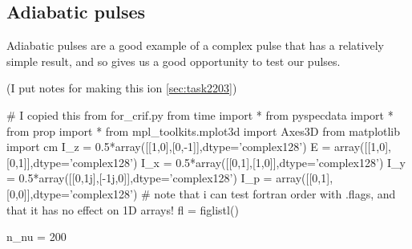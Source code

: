\subsection{Adiabatic pulses}
Adiabatic pulses are a good example of a complex pulse that has a relatively simple result, and so gives us a good opportunity to test our pulses.

\label{sec:task2203_innb}
(I put notes for making this ion \ref{sec:task2203})

\begin{python}
# I copied this from for_crif.py
from time import *
from pyspecdata import *
from prop import *
from mpl_toolkits.mplot3d import Axes3D
from matplotlib import cm
I_z = 0.5*array([[1,0],[0,-1]],dtype='complex128')
E = array([[1,0],[0,1]],dtype='complex128')
I_x = 0.5*array([[0,1],[1,0]],dtype='complex128')
I_y = 0.5*array([[0,1j],[-1j,0]],dtype='complex128')
I_p = array([[0,1],[0,0]],dtype='complex128')
# note that i can test fortran order with .flags, and that it has no effect on 1D arrays!
fl = figlistl()

n_nu = 200


\end{python}
